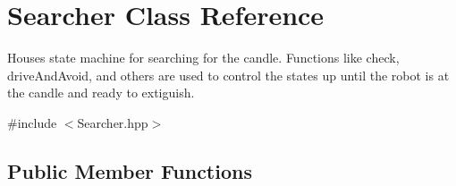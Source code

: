 \hypertarget{classSearcher}{\section{Searcher Class Reference}
\label{classSearcher}
}


Houses state machine for searching for the candle. Functions like check, drive\-And\-Avoid, and others are used to control the states up until the robot is at the candle and ready to extiguish.  




{\ttfamily \#include $<$Searcher.\-hpp$>$}

\subsection*{Public Member Functions}
